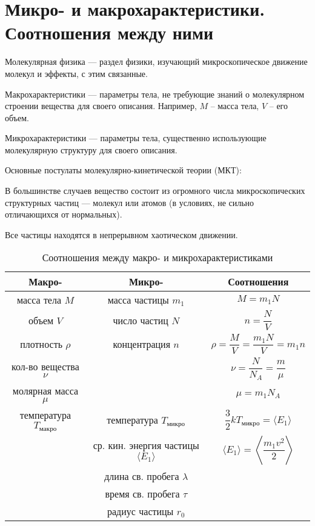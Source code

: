 \section{Микро- и макрохарактеристики. Соотношения между ними}

	Молекулярная физика --- раздел физики, изучающий микроскопическое движение молекул и эффекты, с этим связанные. \par
	Макрохарактеристики --- параметры тела, не требующие знаний о молекулярном строении вещества для своего описания. Например, $M$ -- масса тела, $V$ -- его объем. \par
	Микрохарактеристики --- параметры тела, существенно использующие молекулярную структуру для своего описания. \par
	Основные постулаты молекулярно-кинетической теории (МКТ):
	\begin{post}
		 В большинстве случаев вещество состоит из огромного числа микроскопических структурных частиц --- молекул или атомов (в условиях, не сильно отличающихся от нормальных).
	\end{post}
	\begin{post}
		Все частицы находятся в непрерывном хаотическом движении.
	\end{post}
	\begin{table}[htp]
		\caption{Соотношения между макро- и микрохарактеристиками}
		\centering
		\begin{tabular}{c|c|c}
			\toprule
				Макро- 							& Микро-	 					 & Соотношения 											\\
			\midrule
				масса тела $M$					& масса частицы $m_1$			 & $M=m_1 N$											\\
				объем $V$						& число частиц $N$				 & $n=\dfrac {N}{V}$									\\
				плотность $\rho$				& концентрация $n$				 & $\rho=\dfrac {M}{V}=\dfrac{m_1 N}{V} = m_1n$			\\
				кол-во вещества $\nu$			&								 & $\nu=\dfrac {N}{N_A}=\dfrac{m}{\mu}$					\\
				молярная масса $\mu$			& 								 & $\mu=m_1 N_A$										\\
				температура $T_{\text{макро}}$	& температура $T_{\text{микро}}$ & $\dfrac{3}{2}kT_{\text{микро}}=\langle E_1 \rangle$	\\
												& ср. кин. энергия частицы $\langle E_1 \rangle$ & $\langle E_1 \rangle= \left\langle \dfrac{m_1 v^2}{2} \right\rangle$ \\
												& длина св. пробега $\lambda$	 & \\
												& время св. пробега $\tau$		 & \\
												& радиус частицы $r_0$			 & \\

			\toprule
		\end{tabular}
	\end{table}
